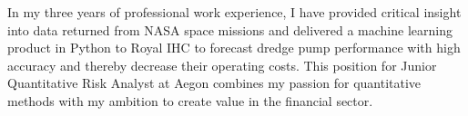 \documentclass[12pt,a4paper,sans]{moderncv} %
\begin{document}
In my three years of professional work experience, I have provided critical insight into data returned from NASA space missions and delivered a machine learning product in Python to Royal IHC to forecast dredge pump performance with high accuracy and thereby decrease their operating costs.
This position for Junior Quantitative Risk Analyst at Aegon combines my passion for quantitative methods with my ambition to create value in the financial sector.
\vspace{0.25cm}
\end{document}
